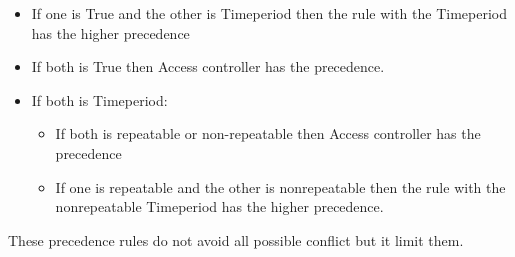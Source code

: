 \begin{itemize}
	\item If one is True and the other is Timeperiod then the rule with the Timeperiod has the higher precedence
	\item If both is True then Access controller has the precedence.
	\item If both is Timeperiod:
		\begin{itemize}
			\item If both is repeatable or non-repeatable then Access controller has the precedence
			\item If one is repeatable and the other is nonrepeatable then the rule with the nonrepeatable Timeperiod has the higher precedence.
		\end{itemize}
\end{itemize}

These precedence rules do not avoid all possible conflict but it limit them.  
